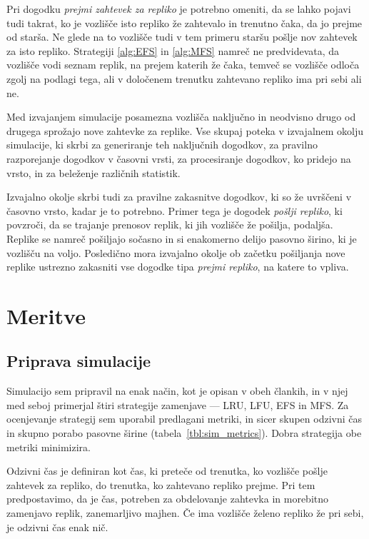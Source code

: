 \documentclass[a4paper, 12pt]{book}
\begin{document}
Pri dogodku \textit{prejmi zahtevek za repliko} je potrebno omeniti, da se
lahko pojavi tudi takrat, ko je vozlišče isto repliko že zahtevalo in trenutno
čaka, da jo prejme od starša. Ne glede na to vozlišče tudi v tem primeru staršu
pošlje nov zahtevek za isto repliko. Strategiji \ref{alg:EFS} in \ref{alg:MFS}
namreč ne predvidevata, da vozlišče vodi seznam replik, na prejem katerih
že čaka, temveč se vozlišče odloča zgolj na podlagi tega, ali v določenem
trenutku zahtevano repliko ima pri sebi ali ne.

Med izvajanjem simulacije posamezna vozlišča naključno in neodvisno drugo od
drugega sprožajo nove zahtevke za replike. Vse skupaj poteka v izvajalnem
okolju simulacije, ki skrbi za generiranje teh naključnih dogodkov, za
pravilno razporejanje dogodkov v časovni vrsti, za procesiranje dogodkov,
ko pridejo na vrsto, in za beleženje različnih statistik.

Izvajalno okolje skrbi tudi za pravilne zakasnitve dogodkov, ki so že uvrščeni
v časovno vrsto, kadar je to potrebno. Primer tega je dogodek
\textit{pošlji repliko}, ki povzroči, da se trajanje prenosov replik, ki
jih vozlišče že pošilja, podaljša. Replike se namreč pošiljajo sočasno in si
enakomerno delijo pasovno širino, ki je vozlišču na voljo. Posledično mora
izvajalno okolje ob začetku pošiljanja nove replike ustrezno zakasniti vse
dogodke tipa \textit{prejmi repliko}, na katere to vpliva.


\section{Meritve}
\subsection{Priprava simulacije}

Simulacijo sem pripravil na enak način, kot je opisan v obeh člankih, in v
njej med seboj primerjal štiri strategije zamenjave --- LRU, LFU, EFS in MFS.
Za ocenjevanje strategij sem uporabil predlagani metriki, in sicer skupen
odzivni čas in skupno porabo pasovne širine (tabela~\ref{tbl:sim_metrics}).
Dobra strategija obe metriki minimizira.

Odzivni čas je definiran kot čas, ki preteče od trenutka, ko vozlišče pošlje
zahtevek za repliko, do trenutka, ko zahtevano repliko prejme. Pri tem
predpostavimo, da je čas, potreben za obdelovanje zahtevka in morebitno
zamenjavo replik, zanemarljivo majhen. Če ima vozlišče želeno repliko že
pri sebi, je odzivni čas enak nič.
\end{document}
